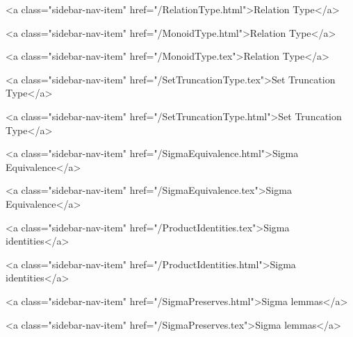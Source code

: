       
    
      
        
          <a class="sidebar-nav-item" href="/RelationType.html">Relation Type</a>
        
      
    
      
        
          <a class="sidebar-nav-item" href="/MonoidType.html">Relation Type</a>
        
      
    
      
        
          <a class="sidebar-nav-item" href="/MonoidType.tex">Relation Type</a>
        
      
    
      
        
          <a class="sidebar-nav-item" href="/SetTruncationType.tex">Set Truncation Type</a>
        
      
    
      
        
          <a class="sidebar-nav-item" href="/SetTruncationType.html">Set Truncation Type</a>
        
      
    
      
        
          <a class="sidebar-nav-item" href="/SigmaEquivalence.html">Sigma Equivalence</a>
        
      
    
      
        
          <a class="sidebar-nav-item" href="/SigmaEquivalence.tex">Sigma Equivalence</a>
        
      
    
      
        
          <a class="sidebar-nav-item" href="/ProductIdentities.tex">Sigma identities</a>
        
      
    
      
        
          <a class="sidebar-nav-item" href="/ProductIdentities.html">Sigma identities</a>
        
      
    
      
        
          <a class="sidebar-nav-item" href="/SigmaPreserves.html">Sigma lemmas</a>
        
      
    
      
        
          <a class="sidebar-nav-item" href="/SigmaPreserves.tex">Sigma lemmas</a>
        
